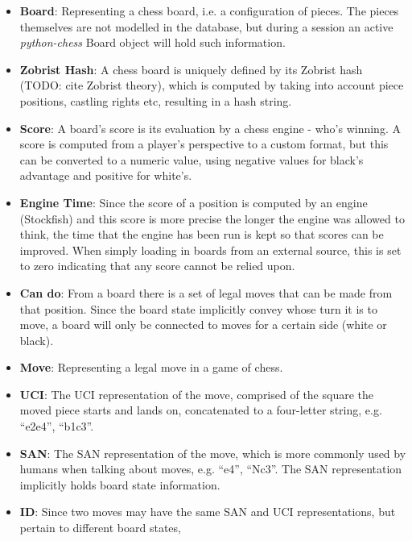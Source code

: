 \documentclass[a4paper,11pt,x11 names]{article}
\begin{document}
\begin{itemize}
    \item \textbf{Board}: Representing a chess board, i.e. a configuration
        of pieces. The pieces themselves are not modelled in the database,
        but during a session an active \textit{python-chess} Board
        object will hold such information.

    \item \textbf{Zobrist Hash}: A chess board is uniquely defined
        by its Zobrist hash (TODO: cite Zobrist theory),
        which is computed by taking into account piece positions,
        castling rights etc, resulting in a hash string.
    \item \textbf{Score}: A board's score is its evaluation by a chess
        engine - who's winning. A score is computed from a player's 
        perspective to a custom format,
        but this can be converted to a numeric value, using negative
        values for black's advantage and positive for white's.
    \item \textbf{Engine Time}: Since the score of a position is computed
        by an engine (Stockfish) and this score is more precise the longer
        the engine was allowed to think, the time that the engine has been
        run is kept so that scores can be improved. When simply loading
        in boards from an external source, this is set to zero
        indicating that any score cannot be relied upon.
    \item \textbf{Can do}: From a board there is a set of legal moves
        that can be made from that position. Since the board state
        implicitly convey whose turn it is to move, a board will
        only be connected to moves for a certain side (white or black).
    \item \textbf{Move}: Representing a legal move in a game of chess. 
    \item \textbf{UCI}: The UCI representation of the move, 
        comprised of the square the moved piece starts and lands on,
        concatenated to a four-letter string, e.g. ``e2e4'', ``b1c3''.
    \item \textbf{SAN}: The SAN representation of the move, which
        is more commonly used by humans when talking about moves,
        e.g. ``e4'', ``Nc3''. The SAN representation implicitly holds
        board state information.
    \item \textbf{ID}: Since two moves may have the same SAN and UCI
        representations, but pertain to different board states,

\end{itemize}
\end{document}
